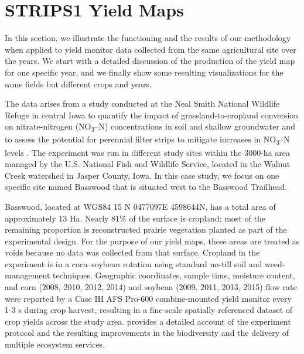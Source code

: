 \section{STRIPS1 Yield Maps}

 In this section, we illustrate the
functioning and the results of our methodology when applied to yield
monitor data collected from the same agricultural site over the
years. We start with a detailed discussion of the production of the
yield map for one specific year, and we finally show some resulting
visualizations for the same fields but different crops and years.

 The data arises from a study
conducted at the Neal Smith National Wildlife Refuge in central Iowa
to quantify the impact of grassland-to-cropland conversion on
nitrate-nitrogen (NO\textsubscript{3}–N) concentrations in soil and
shallow groundwater and to assess the potential for perennial filter
strips to mitigate increases in NO\textsubscript{3}–N levels
\citep{Zhou2010}. The experiment was run in different study sites
within the 3000-ha area managed by the U.S. National Fish and Wildlife
Service, located in the Walnut Creek watershed in Jasper County,
Iowa. In this case study, we focus on one specific site named Basswood
that is situated west to the Basswood Trailhead.

 Basswood, located at WGS84 15 N
0477097E 4598644N, has a total area of approximately 13 Ha. Nearly
81\% of the surface is cropland; most of the remaining proportion is
reconstructed prairie vegetation planted as part of the experimental
design. For the purpose of our yield maps, these areas are treated as
voids because no data was collected from that surface. Cropland in the
experiment is in a corn–soybean rotation using standard no-till soil
and weed-management techniques. Geographic coordinates, sample time,
moisture content, and corn (2008, 2010, 2012, 2014) and soybean (2009,
2011, 2013, 2015) flow rate were reported by a Case IH AFS Pro-600
combine-mounted yield monitor every 1-3 s during crop harvest,
resulting in a fine-scale spatially referenced dataset of crop yields
across the study area. \cite{Schulte2017} provides a detailed account
of the experiment protocol and the resulting improvements in the
biodiversity and the delivery of multiple ecosystem services.

